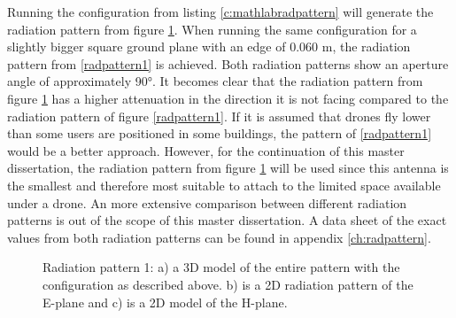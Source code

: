 Running the configuration from listing \ref{c:mathlabradpattern} will generate the radiation pattern from figure \ref{radpattern2}.
When running the same configuration for a slightly bigger square ground plane with an edge of 0.060 m, the radiation pattern from \ref{radpattern1} is
achieved. Both radiation patterns show an aperture angle of approximately 90°. It becomes clear that the radiation pattern from figure \ref{radpattern2} has a higher attenuation in the direction it is not facing compared to
the radiation pattern of figure \ref{radpattern1}. If it is assumed that drones fly lower than some users are positioned in some buildings, the pattern of 
\ref{radpattern1} would be a better approach. 
However, for the continuation of this master dissertation, the radiation pattern from figure \ref{radpattern2} 
will be used since this antenna is the smallest
and therefore most suitable to attach to the limited space available under a drone. 
An more extensive comparison between different radiation patterns is out of the scope of this master dissertation. 
A data sheet of the exact values from both radiation patterns can be
found in appendix \ref{ch:radpattern}.


\begin{figure}[!htb]
\caption{Radiation pattern 1: a) a 3D model of the entire pattern with the configuration as described above. b) is a 2D radiation pattern of the E-plane and c) is a 2D model of the H-plane.}
  \label{radpattern2}
\end{figure}

